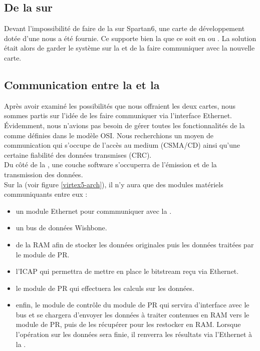 
\subsection{De la  sur \virtex{}}

Devant l'impossibilité de faire de la  sur Spartan6, une carte de développement dotée d'une \virtex{} nous a été fournie. Ce \fpga{} supporte bien la  que ce soit en  ou . La solution était alors de garder le système sur la \nexys{} et de la faire communiquer avec la nouvelle carte.

\subsection{Communication entre la \virtex{} et la \nexys{}}

Après avoir examiné les possibilités que nous offraient les deux cartes, nous sommes partis sur l'idée de les faire communiquer via l'interface Ethernet. Évidemment, nous n'avions pas besoin de gérer toutes les fonctionnalités de la  comme définies dans le modèle OSI. Nous recherchions un moyen de communication qui s'occupe de l'accès au medium (CSMA/CD) ainsi qu'une certaine fiabilité des données transmises (CRC).\\
Du côté de la \nexys{}, une couche software s'occuperra de l'émission et de la transmission des données.\\
Sur la \virtex{} (voir figure \ref{virtex5-arch}), il n'y aura que des modules matériels communiquants entre eux :

\begin{itemize}
  \item un module Ethernet pour commmuniquer avec la \nexys{}.
  \item un bus de données Wishbone.
  \item de la RAM afin de stocker les données originales puis les données traitées par le module de PR.
  \item l'ICAP qui permettra de mettre en place le bitstream reçu via Ethernet.
  \item le module de PR qui effectuera les calculs sur les données.
  \item enfin, le module de contrôle du module de PR qui servira d'interface avec le bus et se chargera d'envoyer les données à traiter contenues en RAM vers le module de PR, puis de les récupérer pour les restocker en RAM. Lorsque l'opération sur les données sera finie, il renverra les résultats via l'Ethernet à la \nexys{}.
\end{itemize}

